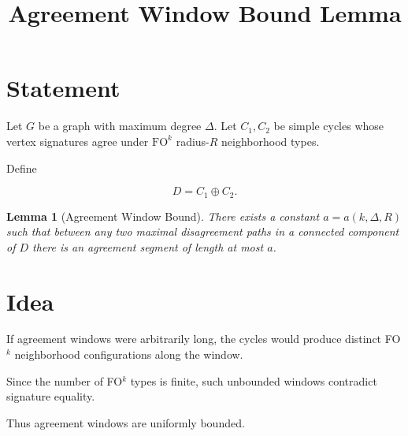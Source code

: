 \documentclass[11pt]{article}
\title{Agreement Window Bound Lemma}
\date{}
\newtheorem{lemma}{Lemma}
\begin{document}
\maketitle

\section*{Statement}

Let \(G\) be a graph with maximum degree \(\Delta\).  
Let \(C_1,C_2\) be simple cycles whose vertex signatures agree under
\(\mathrm{FO}^k\) radius-\(R\) neighborhood types.

Define

\[
D = C_1 \oplus C_2 .
\]

\begin{lemma}[Agreement Window Bound]

There exists a constant \(a=a(k,\Delta,R)\) such that between any two
maximal disagreement paths in a connected component of \(D\) there is
an agreement segment of length at most \(a\).

\end{lemma}

\section*{Idea}

If agreement windows were arbitrarily long, the cycles would produce
distinct FO\(^k\) neighborhood configurations along the window.

Since the number of FO\(^k\) types is finite, such unbounded windows
contradict signature equality.

Thus agreement windows are uniformly bounded.
\end{document}
